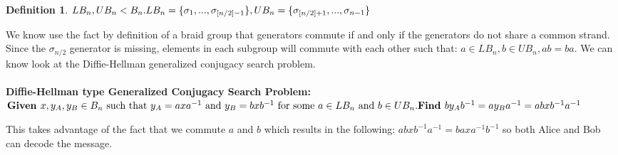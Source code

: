 \documentclass{article}
\theoremstyle{definition}
\newtheorem{definition}{Definition}[section]
\begin{document}
\begin{definition}
$LB_n,UB_n < B_n. \\ LB_n=\{ \sigma_1,...,\sigma_{[n/2]-1}  \}, UB_n=\{ \sigma_{[n/2]+1},...,\sigma_{n-1}  \} $
\end{definition}

We know use the fact by definition of a braid group that generators commute if and only if the generators do not share a common strand. Since the $\sigma_{n/2}$ generator is missing, elements in each subgroup will commute with each other such that: $a \in LB_n, b \in UB_n, ab=ba$. We can know look at the Diffie-Hellman generalized conjugacy search problem.
\\ \\
\noindent \textbf{Diffie-Hellman type Generalized Conjugacy Search Problem:} \\ $\textbf{Given }x,y_A, y_B \in B_n \text{ such that }y_A=axa^{-1} \text{ and } y_B=bxb^{-1} \text{ for some }a \in LB_n \text{ and }b \in UB_n. \\ \textbf{Find }by_Ab^{-1}=ay_Ba^{-1}=abxb^{-1}a^{-1}$

This takes advantage of the fact that we commute $a$ and $b$ which results in the following: $abxb^{-1}a^{-1}=baxa^{-1}b^{-1}$ so both Alice and Bob can decode the message. 

	
\end{document}
